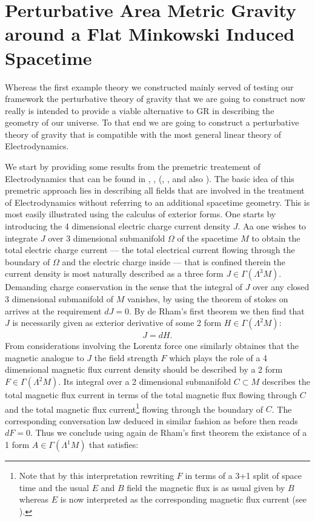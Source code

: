 \documentclass[a4paper,12pt, DIV=14, BCOR=5mm, twoside, headsepline]{scrbook}
\begin{document}
\section{Perturbative Area Metric Gravity around a Flat Minkowski Induced Spacetime}
Whereas the first example theory we constructed mainly served of testing our framework the perturbative theory of gravity that we are going to construct now really is intended to provide a viable alternative to GR in describing the geometry of our universe.  
To that end we are going to construct a perturbative theory of gravity that is compatible with the most general linear theory of Electrodynamics. 

We start by providing some results from the premetric treatement of Electrodynamics that can be found in \cite{1999PhLB..458..466O}, \cite{1999gr.qc....11096H}, (\cite{hehl2003foundations}, \cite{2006physics..10221H}, \cite{2004PhRvD..70j5022L} and also \cite{Hehl2005}). The basic idea of this premetric approach lies in describing all fields that are involved in the treatment of Electrodynamics without referring to an additional spacetime geometry. This is most easily illustrated using the calculus of exterior forms. One starts by introducing the 4 dimensional electric charge current density $J$. Aa one wishes to integrate $J$ over 3 dimensional submanifold $\Omega$ of the spacetime $M$ to obtain the total electric charge current --- the total electrical current flowing through the boundary of $\Omega$ and the electric charge inside --- that is confined therein the current density is most naturally described as a three form $J \in \Gamma(\Lambda^3M)$. Demanding charge conservation in the sense that the integral of $J$ over any closed 3 dimensional submanifold of $M$ vanishes, by using the theorem of stokes on arrives at the requirement $dJ =0$. By de Rham's first theorem we then find that $J$ is necessarily given as exterior derivative of some 2 form $H \in \Gamma(\Lambda^2M)$:
\begin{align}
    J = d H.
\end{align}
From considerations involving the Lorentz force one similarly obtaines that the magnetic analogue to $J$ the field strength $F$ which plays the role of a 4 dimensional magnetic flux current density should be described by a 2 form $F \in \Gamma(\Lambda^2M)$. Its integral over a 2 dimensional submanifold $C \subset M$ describes the total magnetic flux current in terms of the total magnetic flux flowing through $C$ and the total magnetic flux current\footnote{Note that by this interpretation rewriting $F$ in terms of a 3+1 split of space time and the usual $E$ and $B$ field the magnetic flux is as usual given by $B$ whereas $E$ is now interpreted as the corresponding magnetic flux current (see \cite{2006physics..10221H}).} flowing through the boundary of $C$. The corresponding conversation law deduced in similar fashion as before then reads $dF =0$. Thus we conclude using again de Rham's first theorem the existance of a 1 form $A \in \Gamma(\Lambda^1M)$ that satisfies:
\end{document}
